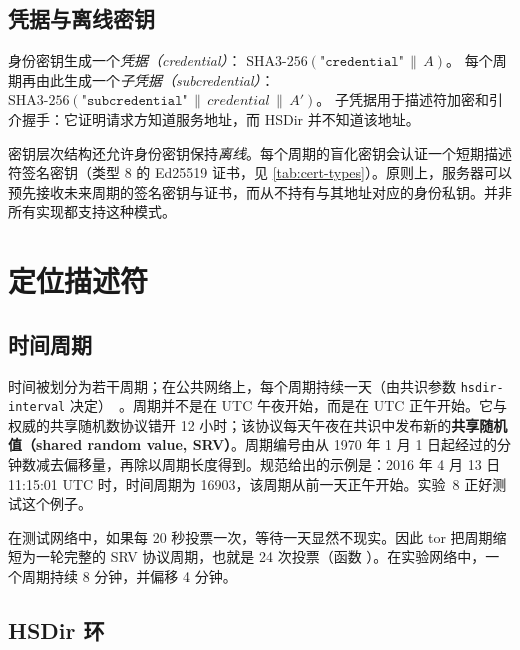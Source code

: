 \subsection{凭据与离线密钥}

身份密钥生成一个\emph{凭据（credential）}：
$\mathrm{SHA3\text{-}256}(\texttt{"credential"} \,\|\, A)$。
每个周期再由此生成一个\emph{子凭据（subcredential）}：
$\mathrm{SHA3\text{-}256}(\texttt{"subcredential"} \,\|\, \mathit{credential} \,\|\, A')$。
子凭据用于描述符加密和引介握手：它证明请求方知道服务地址，而 HSDir 并不知道该地址。

密钥层次结构还允许身份密钥保持\emph{离线}。每个周期的盲化密钥会认证一个短期描述符签名密钥（类型 8 的 Ed25519 证书，见 \cref{tab:cert-types}）。原则上，服务器可以预先接收未来周期的签名密钥与证书，而从不持有与其地址对应的身份私钥。并非所有实现都支持这种模式。

\section{定位描述符}\label{sec:os-hsdir}

\subsection{时间周期}

时间被划分为若干周期；在公共网络上，每个周期持续一天（由共识参数 \texttt{hsdir-interval} 决定）~。周期并不是在 UTC 午夜开始，而是在 UTC 正午开始。它与权威的共享随机数协议错开 12 小时；该协议每天午夜在共识中发布新的\textbf{共享随机值（shared random value, SRV）}。周期编号由从 1970 年 1 月 1 日起经过的分钟数减去偏移量，再除以周期长度得到。规范给出的示例是：2016 年 4 月 13 日 11:15:01 UTC 时，时间周期为 16903，该周期从前一天正午开始。实验~8 正好测试这个例子。

在测试网络中，如果每 20 秒投票一次，等待一天显然不现实。因此 tor 把周期缩短为一轮完整的 SRV 协议周期，也就是 24 次投票（函数 ）。在实验网络中，一个周期持续 8 分钟，并偏移 4 分钟。

\subsection{HSDir 环}

